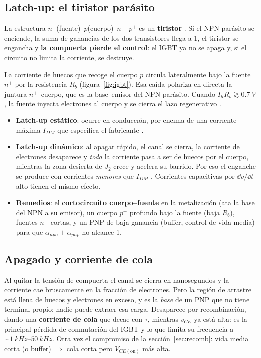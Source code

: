 \subsection{Latch-up: el tiristor parásito}

La estructura $n^+$(fuente)--$p$(cuerpo)--$n^-$--$p^+$ es un \textbf{tiristor} . Si el
NPN parásito se enciende, la suma de ganancias de los dos transistores llega a 1, el tiristor se
engancha y \textbf{la compuerta pierde el control}: el IGBT ya no se apaga y, si el circuito no limita
la corriente, se destruye.

\begin{intuicion}
La corriente de huecos que recoge el cuerpo $p$ circula lateralmente bajo la fuente $n^+$ por la
resistencia $R_b$ (figura~\ref{fig:igbt}). Esa caída polariza en directa la juntura
$n^+$--cuerpo, que es la base--emisor del NPN parásito. Cuando $I_hR_b\gtrsim\SI{0.7}{V}$, la fuente
inyecta electrones al cuerpo y se cierra el lazo regenerativo .
\end{intuicion}

\begin{itemize}
  \item \textbf{Latch-up estático}: ocurre en conducción, por encima de una corriente máxima
  $I_{DM}$ que especifica el fabricante .
  \item \textbf{Latch-up dinámico}: al apagar rápido, el canal se cierra, la corriente de electrones
  desaparece y \emph{toda} la corriente pasa a ser de huecos por el cuerpo, mientras la zona desierta
  de $J_2$ crece y acelera su barrido. Por eso el enganche se produce con corrientes \emph{menores}
  que $I_{DM}$ . Corrientes capacitivas por $\dd v/\dd t$ alto tienen el mismo efecto.
  \item \textbf{Remedios}: el \textbf{cortocircuito cuerpo--fuente} en la metalización  (ata
  la base del NPN a su emisor), un cuerpo $p^+$ profundo bajo la fuente (baja $R_b$), fuentes $n^+$
  cortas, y un PNP de baja ganancia (buffer, control de vida media) para que $\alpha_{npn}+\alpha_{pnp}$
  no alcance 1.
\end{itemize}

\subsection{Apagado y corriente de cola}

Al quitar la tensión de compuerta el canal se cierra en nanosegundos y la corriente cae
bruscamente en la fracción de electrones. Pero la región de arrastre está llena de huecos y
electrones en exceso, y es la \emph{base} de un PNP que no tiene terminal propio: nadie puede extraer
esa carga. Desaparece por recombinación, dando una \textbf{corriente de cola} que decae con $\tau$,
mientras $v_{CE}$ ya está alta: es la principal pérdida de conmutación del IGBT y lo que limita su
frecuencia a $\sim\SIrange{1}{50}{kHz}$. Otra vez el compromiso de la sección~\ref{sec:recomb}: vida
media corta (o buffer) $\Rightarrow$ cola corta pero $V_{CE(\mathrm{on})}$ más alta.

